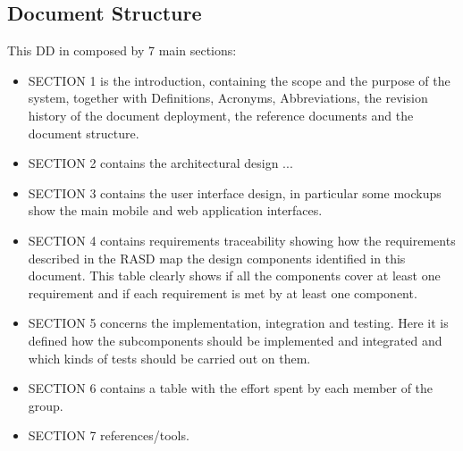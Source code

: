	\subsection{Document Structure}
	This DD in composed by 7 main sections:
	\begin {itemize}
	 	\item SECTION 1 is the introduction, containing the scope and the purpose of the system, together with Definitions, Acronyms, Abbreviations, the revision history of the document deployment, the reference documents and the document structure.
		\item SECTION 2 contains the architectural design ...
		\item SECTION 3 contains the user interface design, in particular some mockups show the main mobile and web application interfaces.
		\item SECTION 4 contains requirements traceability showing how the requirements described in the RASD map the design components identified in this document. This table clearly shows if all the components cover at least one requirement and if each requirement is met by at least one component.
		\item SECTION 5 concerns the implementation, integration and testing. Here it is defined how the subcomponents should be implemented and integrated and which kinds of tests should be carried out on them.
		\item SECTION 6 contains a table with the effort spent by each member of the group.
		\item SECTION 7 references/tools.
	\end{itemize}
	
